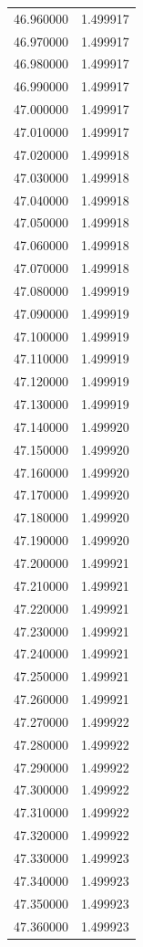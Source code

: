\begin{tabular}{rr}
46.960000 & 1.499917 \\
46.970000 & 1.499917 \\
46.980000 & 1.499917 \\
46.990000 & 1.499917 \\
47.000000 & 1.499917 \\
47.010000 & 1.499917 \\
47.020000 & 1.499918 \\
47.030000 & 1.499918 \\
47.040000 & 1.499918 \\
47.050000 & 1.499918 \\
47.060000 & 1.499918 \\
47.070000 & 1.499918 \\
47.080000 & 1.499919 \\
47.090000 & 1.499919 \\
47.100000 & 1.499919 \\
47.110000 & 1.499919 \\
47.120000 & 1.499919 \\
47.130000 & 1.499919 \\
47.140000 & 1.499920 \\
47.150000 & 1.499920 \\
47.160000 & 1.499920 \\
47.170000 & 1.499920 \\
47.180000 & 1.499920 \\
47.190000 & 1.499920 \\
47.200000 & 1.499921 \\
47.210000 & 1.499921 \\
47.220000 & 1.499921 \\
47.230000 & 1.499921 \\
47.240000 & 1.499921 \\
47.250000 & 1.499921 \\
47.260000 & 1.499921 \\
47.270000 & 1.499922 \\
47.280000 & 1.499922 \\
47.290000 & 1.499922 \\
47.300000 & 1.499922 \\
47.310000 & 1.499922 \\
47.320000 & 1.499922 \\
47.330000 & 1.499923 \\
47.340000 & 1.499923 \\
47.350000 & 1.499923 \\
47.360000 & 1.499923 \\

\end{tabular}
